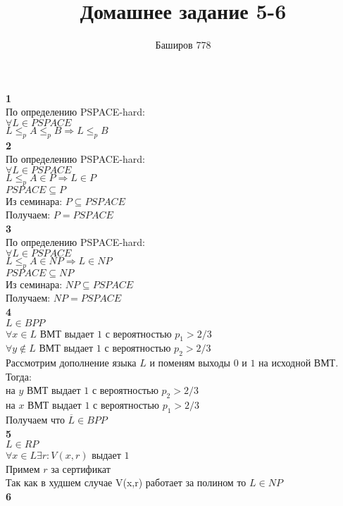 \documentclass[a4paper,12pt]{article}
\author{Баширов 778}
\title{Домашнее задание 5-6}
\begin{document}
\maketitle
\newpage
\noindent \large\textbf{1}\normalsize\\
По определению PSPACE-hard:\\
$\forall L \in PSPACE$\\ $L\leq_{p} A \leq_{p} B \Rightarrow L \leq_{p} B$\\
\large\textbf{2}\normalsize\\
По определению PSPACE-hard:\\
$\forall L \in PSPACE$\\ $L\leq_{p} A \in P \Rightarrow L \in P$\\$PSPACE \subseteq P$ \\Из семинара: $P \subseteq PSPACE$ \\Получаем: $P = PSPACE$\\
\large\textbf{3}\normalsize\\
По определению PSPACE-hard:\\
$\forall L \in PSPACE$\\ $L\leq_{p} A \in NP \Rightarrow L \in NP$\\$PSPACE \subseteq NP$ \\Из семинара: $NP \subseteq PSPACE$ \\Получаем: $NP = PSPACE$\\
\large\textbf{4}\normalsize\\
$L \in BPP$\\
$\forall x \in L$ ВМТ выдает $1$ с вероятностью $p_1 > 2/3$\\ $\forall y \notin L$ ВМТ выдает $1$ с вероятностью $p_2 > 2/3$\\ 
Рассмотрим дополнение языка $L$ и поменям выходы $0$ и $1$ на исходной ВМТ. Тогда:\\на $y$ ВМТ выдает $1$ с вероятностью $p_2 > 2/3$\\  на $x$ ВМТ выдает $1$ с вероятностью $p_1 > 2/3$\\Получаем что $\overline{L} \in BPP$\\
\large\textbf{5}\normalsize\\
$L \in RP$\\
$\forall x \in L \exists r : V(x,r)$ выдает $1$\\ Примем $r$ за сертификат\\ Так как в худшем случае V(x,r) работает за полином то $L \in NP$\\
\large\textbf{6}\normalsize\\
\end{document}
